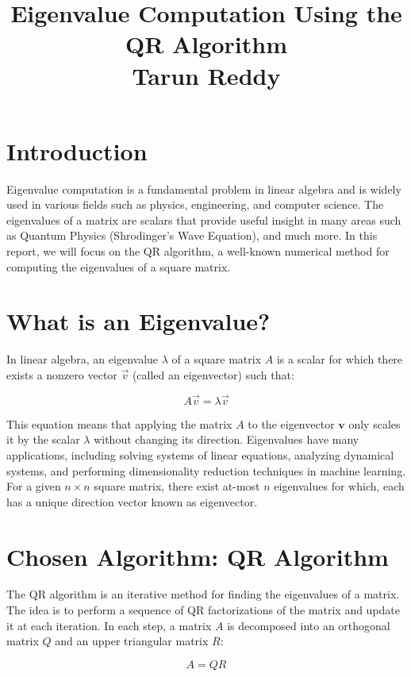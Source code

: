 \documentclass[a4paper,12pt]{report}
\title{\vspace{-2cm} \textbf{\huge Eigenvalue Computation Using the QR Algorithm} \\[1cm] \large Tarun Reddy}
\author{}
\date{}
\begin{document}
\maketitle
\newpage

\section*{\textcolor{myblue}{Introduction}}
Eigenvalue computation is a fundamental problem in linear algebra and is widely used in various fields such as physics, engineering, and computer science. The eigenvalues of a matrix are scalars that provide useful insight in many areas such as Quantum Physics (Shrodinger's Wave Equation), and much more. In this report, we will focus on the QR algorithm, a well-known numerical method for computing the eigenvalues of a square matrix.

\section*{\textcolor{myblue}{What is an Eigenvalue?}}
In linear algebra, an eigenvalue \( \lambda \) of a square matrix \( A \) is a scalar for which there exists a nonzero vector \( \overrightarrow{v} \) (called an eigenvector) such that:

\[
A \overrightarrow{v} = \lambda \overrightarrow{v}
\]

This equation means that applying the matrix \( A \) to the eigenvector \( \mathbf{v} \) only scales it by the scalar \( \lambda \) without changing its direction. Eigenvalues have many applications, including solving systems of linear equations, analyzing dynamical systems, and performing dimensionality reduction techniques in machine learning. For a given \(n\times n\) square matrix, there exist at-most \(n\) eigenvalues for which, each has a unique direction vector known as eigenvector.

\section*{\textcolor{myblue}{Chosen Algorithm: QR Algorithm}}
The QR algorithm is an iterative method for finding the eigenvalues of a matrix. The idea is to perform a sequence of QR factorizations of the matrix and update it at each iteration. In each step, a matrix \( A \) is decomposed into an orthogonal matrix \( Q \) and an upper triangular matrix \( R \):

\[
A = QR
\]
\end{document}
